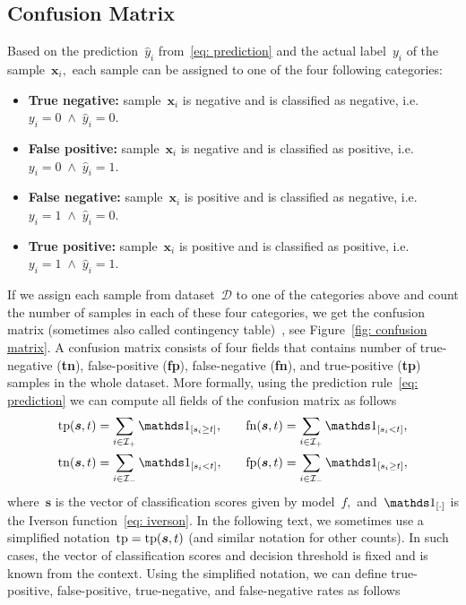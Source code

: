 \subsection{Confusion Matrix}

Based on the prediction~$\hat{y}_i$ from~\eqref{eq: prediction} and the actual label~$y_i$ of the sample~$\bm{x}_i,$ each sample can be assigned to one of the four following categories:
\begin{itemize}
  \item \textbf{True negative:} sample~$\bm{x}_i$ is negative and is classified as negative, i.e.~$y_i = 0 \; \land \; \hat{y}_i = 0.$
  \item \textbf{False positive:} sample~$\bm{x}_i$ is negative and is classified as positive, i.e.~$y_i = 0 \; \land \; \hat{y}_i = 1.$
  \item \textbf{False negative:} sample~$\bm{x}_i$ is positive and is classified as negative, i.e.~$y_i = 1 \; \land \; \hat{y}_i = 0.$
  \item \textbf{True positive:} sample~$\bm{x}_i$ is positive and is classified as positive, i.e.~$y_i = 1 \; \land \; \hat{y}_i = 1.$
\end{itemize}
If we assign each sample from dataset~$\mathcal{D}$ to one of the categories above and count the number of samples in each of these four categories, we get the confusion matrix (sometimes also called contingency table)~\cite{fawcett2006introduction}, see Figure~\ref{fig: confusion matrix}. A confusion matrix consists of four fields that contains number of true-negative (\textbf{tn}), false-positive (\textbf{fp}), false-negative (\textbf{fn}), and true-positive (\textbf{tp}) samples in the whole dataset. More formally, using the prediction rule~\eqref{eq: prediction} we can compute all fields of the confusion matrix as follows
\begin{equation}\label{eq: confusion counts}
  \begin{aligned}
    \tp(\bm{s}, t) & = \sum_{i \in \Ipos}\Iverson{s_i \geq t}, & \quad
    \fn(\bm{s}, t) & = \sum_{i \in \Ipos}\Iverson{s_i < t}, \\
    \tn(\bm{s}, t) & = \sum_{i \in \Ineg}\Iverson{s_i < t}, & \quad
    \fp(\bm{s}, t) & = \sum_{i \in \Ineg}\Iverson{s_i \geq t},
  \end{aligned}
\end{equation}
where~$\bm{s}$ is the vector of classification scores given by model~$f,$ and~$\Iverson{\cdot}$ is the Iverson function~\eqref{eq: iverson}. In the following text, we sometimes use a simplified notation~$\operatorname{tp} = \operatorname{tp}(\bm{s}, t)$ (and similar notation for other counts). In such cases, the vector of classification scores and decision threshold is fixed and is known from the context. Using the simplified notation, we can define true-positive, false-positive, true-negative, and false-negative rates as follows
